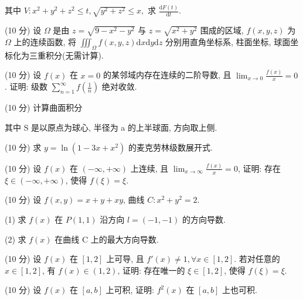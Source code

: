其中 $V: x^{2} + y^{2} + z^{2} \leq t, \sqrt{y^{2} + z^{2}} \leq x,$ 求 $\frac{\mathrm{d}F(t)}{\mathrm{d}t}$.\par
(10 分) 设 $\Omega$ 是由 $z = \sqrt{9 - x^2 - y^2}$ 与 $z = \sqrt{x^2 + y^2}$ 围成的区域, $f(x,y,z)$ 为 $\Omega$ 上的连续函数, 将 $\iiint_{\Omega} f(x,y,z) \mathrm{d}x \mathrm{d}y \mathrm{d}z$ 分别用直角坐标系, 柱面坐标, 球面坐标化为三重积分(无需计算).\par
(10 分) 设 $f(x)$ 在 $x = 0$ 的某邻域内存在连续的二阶导数, 且 $\lim_{x \to 0} \frac{f(x)}{x} = 0$. 证明: 级数 $\sum_{n=1}^{\infty} f\left(\frac{1}{n}\right)$ 绝对收敛.\par
\par{}
(10 分) 计算曲面积分\par
\nopagebreak[4]
其中 S 是以原点为球心, 半径为 a 的上半球面, 方向取上侧.\par
(10 分) 求 $y = \ln (1 - 3x + x^2)$ 的麦克劳林级数展开式.\par
(10 分) 设 $f(x)$ 在 $(- \infty, + \infty)$ 上连续, 且 $\lim_{x \to \infty} \frac{f(x)}{x} = 0$, 证明: 存在 $\xi \in (-\infty, + \infty)$, 使得 $f(\xi) = \xi$.\par
(10 分) 设 $f(x, y) = x + y + xy$, 曲线 $C: x^2 + y^2 = 2$.\par
(1) 求 $f(x)$ 在 $P(1,1)$ 沿方向 $l = (-1, -1)$ 的方向导数.\par
(2) 求  $f(x)$  在曲线 C 上的最大方向导数.\par
(10 分) 设 $f(x)$ 在 $[1,2]$ 上可导, 且 $f'(x) \neq 1, \forall x \in [1,2]$. 若对任意的 $x \in [1,2]$, 有 $f(x) \in (1,2)$, 证明: 存在唯一的 $\xi \in [1,2]$, 使得 $f(\xi) = \xi$.\par
(10 分) 设 $f(x)$ 在 $[a, b]$ 上可积, 证明: $f^2(x)$ 在 $[a, b]$ 上也可积.\par
